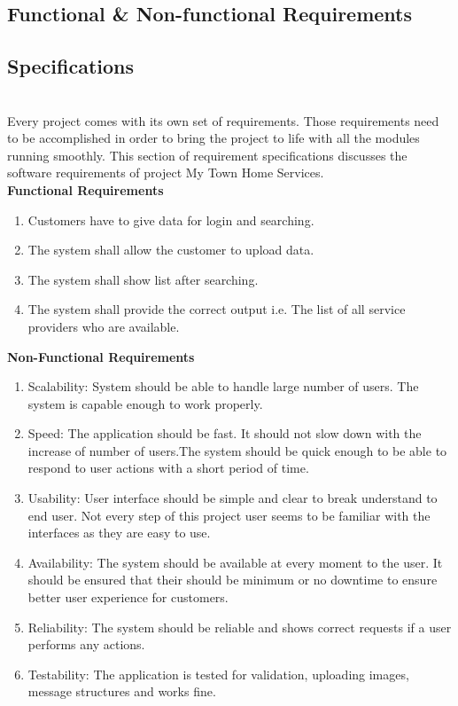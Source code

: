 \documentclass[12pt,a4paper]{report}
\begin{document}
\begin{titlepage}
{\section{ Functional \& Non-functional Requirements }
\vspace{0.5cm}
\subsection{ Specifications}\\
\vspace{0.5cm}
Every project comes with its own set of requirements. Those requirements need to be accomplished in order to bring the project to life with all the modules running smoothly. This section of requirement specifications discusses the software requirements of project My Town Home Services.\\
\newpage
\textbf{Functional Requirements}
\vspace{0.5cm}
\begin{enumerate}
	\item Customers have to give data for login and searching.
	\item The system shall allow the customer to upload data.
	\item The system shall show list after searching.
	\item The system shall provide the correct output i.e. The list of all  service providers who are available.
	\vspace{0.5cm}
\end{enumerate}
\textbf{Non-Functional Requirements}\\
\vspace{0.5cm}
\begin{enumerate}
	\item Scalability: System should be able to handle large number of users. The system is capable enough to work properly.
	\item Speed: The application should be fast. It should not slow down with the increase of number of users.The system should be quick enough to be able to respond to user actions with a short period of time.
	\item Usability: User interface should be simple and clear to break understand to end user. Not every step of this project user seems to be familiar with the interfaces as they are easy to use.
	\item Availability: The system should be available at every moment to the user. It should be ensured that their should be minimum or no downtime to ensure better user experience for customers.
	\item Reliability: The system should be reliable and shows correct requests if a user performs any actions.
	\item Testability: The application is tested for validation, uploading images, message structures and works fine.
\end{enumerate}
\newpage
}
\end{titlepage}
\end{document}
